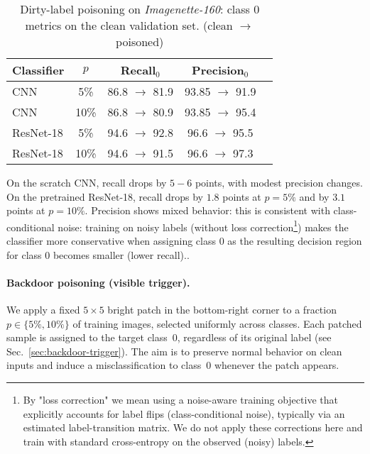 \documentclass{article}
\begin{document}
\begin{table}[H]
  \caption{Dirty-label poisoning on \textit{Imagenette-160}: class 0 metrics on the clean validation set. (clean $\rightarrow$ poisoned)}
  \label{tab:dirtylabel-class0}
  \centering
  \begin{small}
  \begin{tabular}{lcccc}
    \toprule
    Classifier & $p$ & Recall$_0$ & Precision$_0$ \\
    \midrule
    CNN        & 5\%  & 86.8 $\rightarrow$ 81.9  & 93.85 $\rightarrow$ 91.9 \\
    CNN        & 10\% & 86.8 $\rightarrow$ 80.9  & 93.85 $\rightarrow$ 95.4 \\
    ResNet-18\footnotemark[5] & 5\%  & 94.6 $\rightarrow$ 92.8  & 96.6 $\rightarrow$ 95.5 \\
    ResNet-18\footnotemark[5] & 10\% & 94.6 $\rightarrow$ 91.5  & 96.6 $\rightarrow$ 97.3 \\
    \bottomrule
  \end{tabular}
  \end{small}
  \vspace{-0.35cm}
\end{table}

On the scratch CNN, recall drops by $5-6$ points, with modest precision changes. On the pretrained ResNet-18, recall drops by $1.8$ points at $p{=}5\%$ and by $3.1$ points at $p{=}10\%$. Precision shows mixed behavior: this is consistent with class-conditional noise: training on noisy labels (without loss correction\footnote{By "loss correction" we mean using a noise-aware training objective that explicitly accounts for label flips (class-conditional noise), typically via an estimated label-transition matrix\cite{patrini2017makingdeepneuralnetworks}. We do not apply these corrections here and train with standard cross-entropy on the observed (noisy) labels.}) makes the classifier more conservative when assigning class 0 as the resulting decision region for class 0 becomes smaller (lower recall).\cite{patrini2017makingdeepneuralnetworks}.


\paragraph{Backdoor poisoning (visible trigger).}
We apply a fixed $5{\times}5$ bright patch in the bottom-right corner to a fraction $p\in\{5\%,10\%\}$ of training images, selected uniformly across classes. Each patched sample is assigned to the target class~0, regardless of its original label (see Sec.~\ref{sec:backdoor-trigger}). The aim is to preserve normal behavior on clean inputs and induce a misclassification to class~0 whenever the patch appears.
\end{document}
